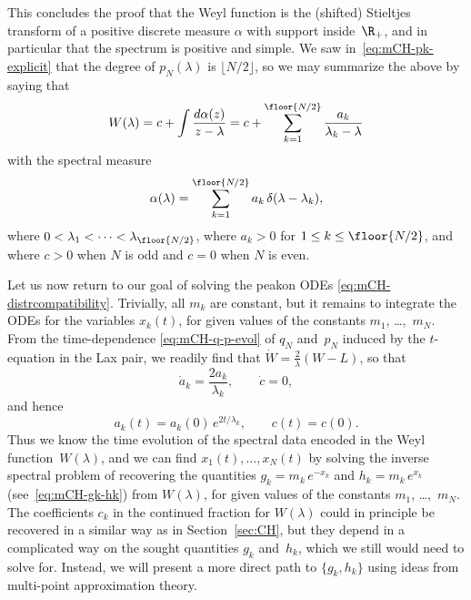 \documentclass[10pt,a4paper]{article} \pdfoutput=1 
\begin{document}
This concludes the proof that the Weyl function is the
(shifted) Stieltjes transform of a positive discrete measure $\alpha$ with support inside~$\R_+$,
and in particular that the spectrum is positive and simple.
We saw in~\eqref{eq:mCH-pk-explicit}
that the degree of $p_N(\lambda)$ is $\lfloor N/2 \rfloor$,
so we may summarize the above by saying that
\begin{equation}
  W(\lambda) = c + \int \frac{d\alpha(z)}{z-\lambda}
  = c + \sum_{k=1}^{\floor{N/2}} \frac{a_k}{\lambda_k - \lambda}
\end{equation}
with the spectral measure
\begin{equation}
  \alpha(\lambda) = \sum_{k=1}^{\floor{N/2}} a_k \, \delta(\lambda-\lambda_k)
  ,
\end{equation}
where $0 < \lambda_1 < \dots < \lambda_{\floor{N/2}}$,
where $a_k > 0$ for
$1 \le k \le \floor{N/2}$,
and where $c>0$ when $N$ is odd
and $c=0$ when $N$ is even.

Let us now return to our goal of solving the peakon ODEs \eqref{eq:mCH-distrcompatibility}.
Trivially, all $m_k$ are constant, but it remains to integrate the ODEs for the variables $x_k(t)$,
for given values of the constants $m_1$, \ldots,~$m_N$.
From the time-dependence \eqref{eq:mCH-q-p-evol}
of $q_N$ and~$p_N$ induced by the $t$-equation in the Lax pair,
we readily find that $\dot W = \frac{2}{\lambda} (W - L)$,
so that
\begin{equation}
  \dot a_k = \frac{2 a_k}{\lambda_k}
  ,\qquad
  \dot c = 0
  ,
\end{equation}
and hence
\begin{equation}
  a_k(t) = a_k(0) \, e^{2t/\lambda_k}
  ,\qquad
  c(t) = c(0)
  .
\end{equation}
Thus we know the time evolution of the spectral data encoded in the Weyl function~$W(\lambda)$,
and we can find $x_1(t),\dots,x_N(t)$ by solving the inverse spectral problem of
recovering the quantities
$g_k = m_k \, e^{-x_k}$
and
$h_k = m_k \, e^{x_k}$
(see~\eqref{eq:mCH-gk-hk})
from $W(\lambda)$,
for given values of the constants $m_1$, \ldots,~$m_N$.
The coefficients $c_k$ in the continued fraction for $W(\lambda)$ could in principle
be recovered in a similar way as in Section~\ref{sec:CH},
but they depend in a complicated way on the sought quantities $g_k$ and~$h_k$,
which we still would need to solve for.
Instead, we will present a more direct path to $\{ g_k, h_k \}$ using ideas from multi-point approximation theory.
\end{document}
